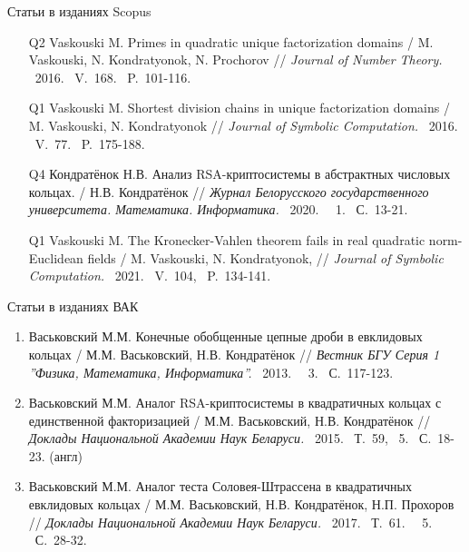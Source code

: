 \documentclass[8pt, xcolor=x11names]{beamer}
\begin{document}
\begin{frame}{Статьи в изданиях Scopus}
    \begin{enumerate}
        \item[Q2] Vaskouski M. Primes in quadratic unique factorization domains / M. Vaskouski, N. Kondratyonok, N. Prochorov // {\it Journal of Number Theory.} \textendash\ 2016. \textendash\ V.~168. \textendash\ P.~101-116.
        
        \item[Q1] Vaskouski M. Shortest division chains in unique factorization domains / M. Vaskouski, N. Kondratyonok // {\it Journal of Symbolic Computation.} \textendash\ 2016. \textendash\ V.~77. \textendash\ P.~175-188.
        
        \item[Q4] Кондратёнок Н.В. Анализ RSA-криптосистемы в абстрактных числовых кольцах. / Н.В. Кондратёнок // {\it Журнал Белорусского государственного университета. Математика. Информатика.} \textendash\ 2020. \textendash\ \textnumero~1. \textendash\ С.~13-21.

        \item[Q1] Vaskouski M. The Kronecker-Vahlen theorem fails in real quadratic norm-Euclidean fields / M. Vaskouski, N. Kondratyonok, // {\it Journal of Symbolic Computation.} \textendash\ 2021. \textendash\ V.~104, \textendash\ P.~134-141.
    \end{enumerate}
\end{frame}

\begin{frame}{Статьи в изданиях ВАК}
    \begin{enumerate}
        \item Васьковский М.М. Конечные обобщенные цепные дроби в евклидовых кольцах / М.М. Васьковский, Н.В. Кондратёнок // {\it Вестник БГУ Серия 1 ''Физика, Математика, Информатика''.} \textendash\ 2013. \textendash\ \textnumero~3. \textendash\ С.~117-123.
        
        \item Васьковский М.М. Аналог RSA-криптосистемы в квадратичных кольцах с единственной факторизацией / М.М. Васьковский, Н.В. Кондратёнок // {\it Доклады Национальной Академии Наук Беларуси.} \textendash\ 2015. \textendash\ Т.~59, \textnumero~5. \textendash\ С.~18-23. (англ)

        \item Васьковский М.М. Аналог теста Соловея-Штрассена в квадратичных евклидовых кольцах / М.М. Васьковский, Н.В. Кондратёнок, Н.П. Прохоров // {\it Доклады Национальной Академии Наук Беларуси.} \textendash\ 2017. \textendash\ Т.~61. \textendash\ \textnumero~5. \textendash\ С.~28-32.
    \end{enumerate}
\end{frame}
\end{document}
